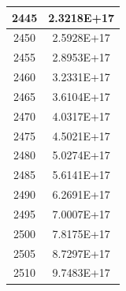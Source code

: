 \documentclass[a4paper]{article}
\begin{document}
\begin{tabular}{|c|c|}
		\hline
		2445 & 2.3218E+17 \\
		\hline
		2450 & 2.5928E+17 \\
		\hline
		2455 & 2.8953E+17 \\
		\hline
		2460 & 3.2331E+17 \\
		\hline
		2465 & 3.6104E+17 \\
		\hline
		2470 & 4.0317E+17 \\
		\hline
		2475 & 4.5021E+17 \\
		\hline
		2480 & 5.0274E+17 \\
		\hline
		2485 & 5.6141E+17 \\
		\hline
		2490 & 6.2691E+17 \\
		\hline
		2495 & 7.0007E+17 \\
		\hline
		2500 & 7.8175E+17 \\
		\hline
		2505 & 8.7297E+17 \\
		\hline
		2510 & 9.7483E+17 \\
		\hline
	\end{tabular}
	\hfill
\end{document}
